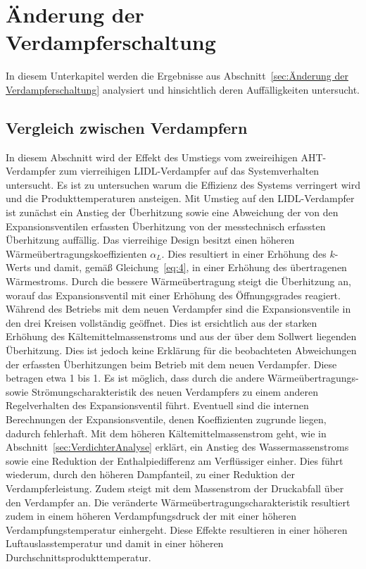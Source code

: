 \section{Änderung der Verdampferschaltung}
\label{sec:Änderung der Verdampferschaltung1}


In diesem Unterkapitel werden die Ergebnisse aus Abschnitt~\ref{sec:Änderung der Verdampferschaltung} analysiert und hinsichtlich deren Auffälligkeiten untersucht.

\subsection{Vergleich zwischen Verdampfern}
\label{subsec:Vergleich zwischen Verdampfern_1}

In diesem Abschnitt wird der Effekt des Umstiegs vom zweireihigen AHT-Verdampfer zum vierreihigen LIDL-Verdampfer auf das Systemverhalten untersucht. Es ist zu untersuchen warum die Effizienz des Systems verringert wird und die Produkttemperaturen ansteigen.
Mit Umstieg auf den LIDL-Verdampfer ist zunächst ein Anstieg der Überhitzung sowie eine Abweichung der von den Expansionsventilen erfassten Überhitzung von der messtechnisch erfassten Überhitzung auffällig. Das vierreihige Design besitzt einen höheren Wärmeübertragungskoeffizienten $\alpha_{L}$. Dies resultiert in einer Erhöhung des $k$-Werts und damit, gemäß Gleichung~\ref{eq:4}, in einer Erhöhung des übertragenen Wärmestroms. Durch die bessere Wärmeübertragung steigt die Überhitzung an, worauf das Expansionsventil mit einer Erhöhung des Öffnungsgrades reagiert. Während des Betriebs mit dem neuen Verdampfer sind die Expansionsventile in den drei Kreisen vollständig geöffnet. Dies ist ersichtlich aus der starken Erhöhung des Kältemittelmassenstroms und aus der über dem Sollwert liegenden Überhitzung. Dies ist jedoch keine Erklärung für die beobachteten Abweichungen der erfassten Überhitzungen beim Betrieb mit dem neuen Verdampfer. Diese betragen etwa \unit{1}{\kelvin} bis \unit{1}{\kelvin}. Es ist möglich, dass durch die andere Wärmeübertragungs- sowie Strömungscharakteristik des neuen Verdampfers zu einem anderen Regelverhalten des Expansionsventil führt\cite{Winter.2012}.  Eventuell sind die internen Berechnungen der Expansionsventile, denen Koeffizienten zugrunde liegen, dadurch fehlerhaft\cite{EmersonClimateTechnologies.2016}. Mit dem höheren Kältemittelmassenstrom geht, wie in Abschnitt~\ref{sec:VerdichterAnalyse} erklärt, ein Anstieg des Wassermassenstroms sowie eine Reduktion der Enthalpiedifferenz am Verflüssiger einher. Dies führt wiederum, durch den höheren Dampfanteil, zu einer Reduktion der Verdampferleistung. Zudem steigt mit dem Massenstrom der Druckabfall über den Verdampfer an. Die veränderte Wärmeübertragungscharakteristik resultiert zudem in einem höheren Verdampfungsdruck der mit einer höheren Verdampfungstemperatur einhergeht. Diese Effekte resultieren in einer höheren Luftauslasstemperatur und damit in einer höheren Durchschnittsprodukttemperatur. \newline
